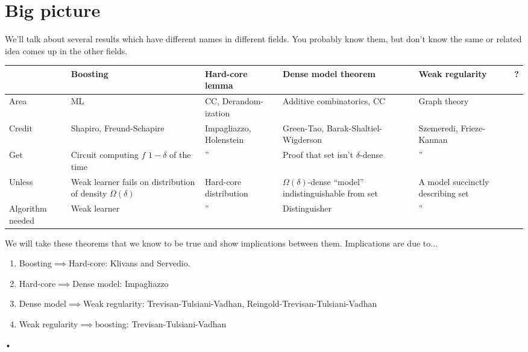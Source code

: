 \section{Big picture}

We'll talk about several results which have different names in different fields. %
You probably know them, but don't know the same or related idea comes up in the other fields.\\

\begin{tabular}{|p{25mm}|p{25mm}|p{25mm}|p{25mm}|p{25mm}|p{1mm}|}
\hline 
 & Boosting & Hard-core lemma & Dense model theorem & Weak regularity & ?\\
\hline 
Area & ML & CC,  Derandom-ization & Additive combinatorics, CC & Graph theory & \\
\hline 
Credit & Shapiro, Freund-Schapire & Impagliazzo, Holenstein & Green-Tao, Barak-Shaltiel-Wigderson & Szemeredi, Frieze-Kannan & \\
\hline 
Get & Circuit computing $f$ $1-\delta$ of the time & '' & Proof that set isn't $\delta$-dense & '' & \\
\hline 
Unless & Weak learner fails on distribution of density $\Omega(\delta)$ & Hard-core distribution  & $\Omega(\delta)$-dense ``model'' indistinguishable from set & A model succinctly describing set & \\
\hline 
Algorithm needed %
 & Weak learner & '' & Distinguisher & '' & \\
\hline 
\end{tabular}

We will take these theorems that we know to be true and show implications between them. Implications are due to...
\begin{enumerate}
\item
Boosting$\implies$Hard-core: 
Klivans and Servedio.
\item
Hard-core$\implies$Dense model:
Impagliazzo
\item Dense model$\implies$Weak regularity:
Trevisan-Tulsiani-Vadhan, Reingold-Trevisan-Tulsiani-Vadhan
\item Weak regularity$\implies$boosting: Trevisan-Tulsiani-Vadhan
\end{enumerate}•

